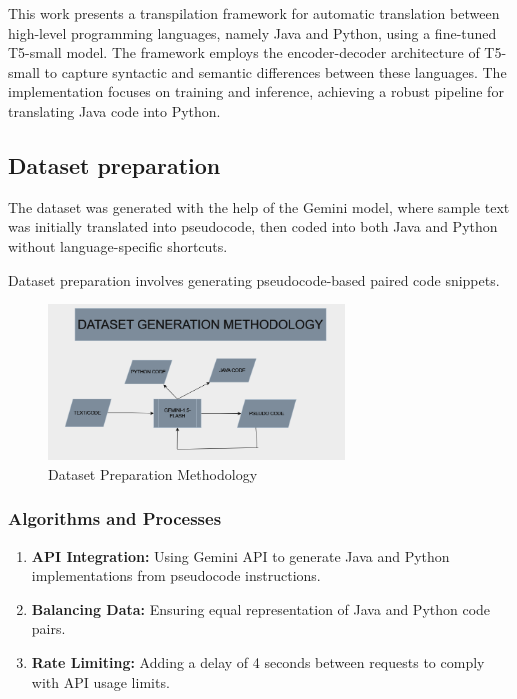 \documentclass{dhbenelux}
\begin{document}
This work presents a transpilation framework for automatic translation between high-level programming languages, namely Java and Python, using a fine-tuned T5-small model. The framework employs the encoder-decoder architecture of T5-small to capture syntactic and semantic differences between these languages. The implementation focuses on training and inference, achieving a robust pipeline for translating Java code into Python.

\subsection{Dataset preparation}
    The dataset was generated with the help of the Gemini model, where sample text was initially translated into pseudocode, then coded into both Java and Python without language-specific shortcuts.
\begin{enumerate}
    Dataset preparation involves generating pseudocode-based paired code snippets. 
    \begin{figure}[h!]
\centering
\includegraphics[width=0.7\textwidth]{dataset_methodology.png} %
\caption{Dataset Preparation Methodology}
\end{figure}
\end{enumerate}
\subsubsection{Algorithms and Processes}

\begin{enumerate}
    \item \textbf{API Integration:} Using Gemini API to generate Java and Python implementations from pseudocode instructions.
    \item \textbf{Balancing Data:} Ensuring equal representation of Java and Python code pairs.
    \item \textbf{Rate Limiting:} Adding a delay of 4 seconds between requests to comply with API usage limits.
\end{enumerate}
\end{document}
